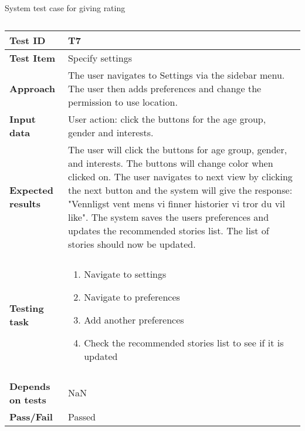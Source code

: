 \begin{appendices}
\begin{table}[H]
	\caption{System test case for giving rating}
	\label{Tab_systemTesting6}
	\end{table}




	\begin{table}[H]
		\centering
		\caption{}
		\begin{tabular}{ | l | l  |}
			\hline
			\textbf{Test ID} & T7  \\ \hline
			\textbf{Test Item} & Specify settings \\ \hline
			\textbf{Approach} & \begin{minipage}{5in}The user navigates to Settings via the sidebar menu. The user then adds preferences and change the permission to use location. \end{minipage}\\ \hline		
			\textbf{Input data} &  \begin{minipage}{5in}User action: click the buttons for the age group, gender and interests. \end{minipage}\\ \hline
			\textbf{Expected results} &  \begin{minipage}{5in}The user will click the buttons for age group, gender, and interests. The buttons will change color when clicked on. The user navigates to next view by clicking the next button and the system will give the response: "Vennligst vent mens vi finner historier vi tror du vil like". 
			The system saves the users preferences and updates the recommended stories list. The list of stories should now be updated.  \end{minipage}\\ \hline&\\[-3.8ex]
			\textbf{Testing task} & \begin{minipage}{5in}
			\begin{enumerate}[noitemsep]
				\item Navigate to settings
				\item Navigate to preferences
				\item Add another preferences
				\item Check the recommended stories list to see if it is updated

			\end{enumerate}\end{minipage}
			\\ &\\[-3.8ex]\hline
			\textbf{Depends on tests} & NaN \\ \hline		
			\textbf{Pass/Fail} & Passed \\\hline			
		\end{tabular}
	\label{Tab:systemTesting7}
	\end{table}



\end{appendices}
\cleardoublepage